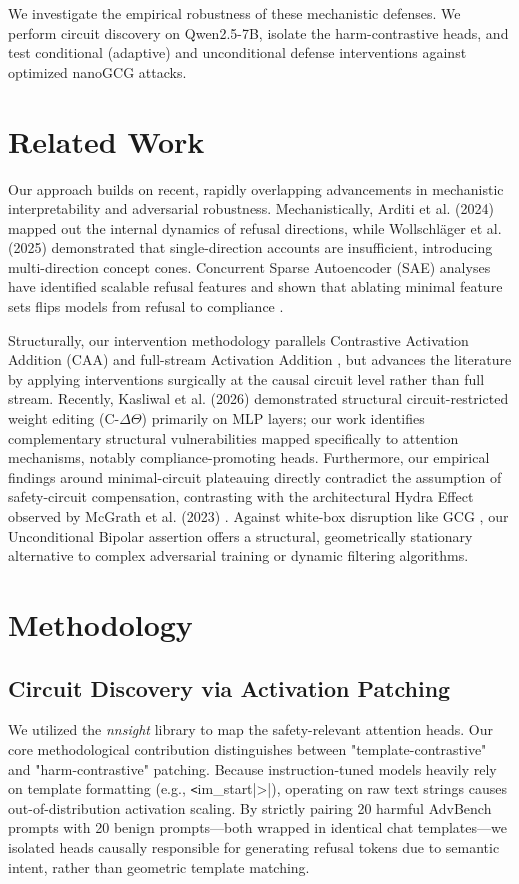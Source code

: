\documentclass[11pt,a4paper]{article}
\begin{document}
We investigate the empirical robustness of these mechanistic defenses. We perform circuit discovery on Qwen2.5-7B, isolate the harm-contrastive heads, and test conditional (adaptive) and unconditional defense interventions against optimized nanoGCG attacks.

\section{Related Work}
Our approach builds on recent, rapidly overlapping advancements in mechanistic interpretability and adversarial robustness. Mechanistically, Arditi et al. (2024) \cite{arditi2024} mapped out the internal dynamics of refusal directions, while Wollschläger et al. (2025) \cite{wollschlager2025} demonstrated that single-direction accounts are insufficient, introducing multi-direction concept cones. Concurrent Sparse Autoencoder (SAE) analyses have identified scalable refusal features \cite{obrien2024} and shown that ablating minimal feature sets flips models from refusal to compliance \cite{yeo2025}. 

Structurally, our intervention methodology parallels Contrastive Activation Addition (CAA) \cite{panickssery2023} and full-stream Activation Addition \cite{turner2023}, but advances the literature by applying interventions surgically at the causal circuit level rather than full stream. Recently, Kasliwal et al. (2026) \cite{kasliwal2026} demonstrated structural circuit-restricted weight editing (C-$\Delta\Theta$) primarily on MLP layers; our work identifies complementary structural vulnerabilities mapped specifically to attention mechanisms, notably compliance-promoting heads. Furthermore, our empirical findings around minimal-circuit plateauing directly contradict the assumption of safety-circuit compensation, contrasting with the architectural Hydra Effect observed by McGrath et al. (2023) \cite{mcgrath2023}. Against white-box disruption like GCG \cite{zou2023}, our Unconditional Bipolar assertion offers a structural, geometrically stationary alternative to complex adversarial training or dynamic filtering algorithms.

\section{Methodology}

\subsection{Circuit Discovery via Activation Patching}
We utilized the \textit{nnsight} library to map the safety-relevant attention heads. Our core methodological contribution distinguishes between "template-contrastive" and "harm-contrastive" patching. Because instruction-tuned models heavily rely on template formatting (e.g., \verb|<|im\_start|>|), operating on raw text strings causes out-of-distribution activation scaling. By strictly pairing 20 harmful AdvBench prompts with 20 benign prompts—both wrapped in identical chat templates—we isolated heads causally responsible for generating refusal tokens due to semantic intent, rather than geometric template matching.
\end{document}
